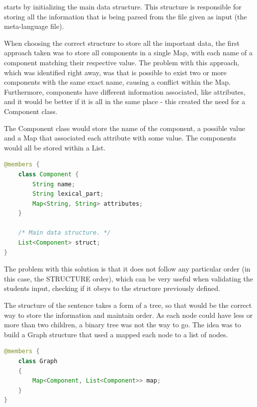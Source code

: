 \noindent starts by initializing the main data structure. This structure is responsible for storing all the information that is being parsed from the file given as input (the meta-language file). 

When choosing the correct structure to store all the important data, the first \/\*approach\*\/ taken was to store all components in a single Map, with each name of a component
matching their respective value. The problem with this approach, which was identified right away, was that is possible to exist two or more components with the same exact
name, causing a conflict within the Map. Furthermore, components have different information associated, like attributes, and it would be better if it is all in the same
place - this created the need for a Component class.

The Component class would store the name of the component, a possible value and a Map that associated each attribute with some value. The components would all be stored
within a List.
\newpage

\begin{center}
\begin{minipage}{10cm}
\begin{lstlisting}[language=java, basicstyle=\small, label={lst:component_class}, caption=Component class]
@members {
    class Component {
        String name;
        String lexical_part;
        Map<String, String> attributes;
    }

    /* Main data structure. */
    List<Component> struct;
}
\end{lstlisting}
\end{minipage}
\end{center}

The problem with this solution is that it does not follow any particular order (in this case, the STRUCTURE order), which can be very useful when validating the students
input, checking if it obeys to the structure previously defined.

The structure of the sentence takes a form of a tree, so that would be the correct way to store the information and maintain order. As each node could have less or more 
than two children, a binary tree was not the way to go. The idea was to build a Graph structure that used a mapped each node to a list of nodes.

\begin{center}
\begin{minipage}{11cm}
\begin{lstlisting}[language=java, basicstyle=\small, label={lst:graph_class}, caption=Graph class]
@members {
    class Graph
    {
        Map<Component, List<Component>> map;
    }
}
\end{lstlisting}
\end{minipage}
\end{center}

